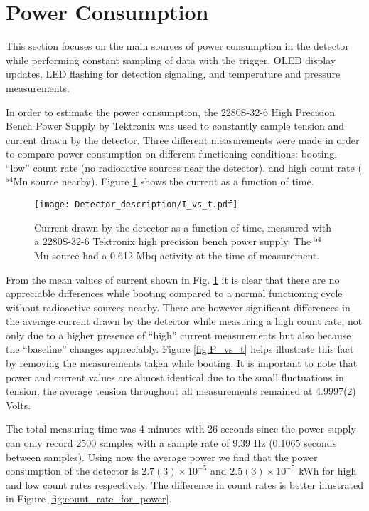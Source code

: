 \section{Power Consumption}

This section focuses on the main sources of power consumption in the detector while performing constant sampling of data with the trigger, OLED display updates, LED flashing for detection signaling, and temperature and pressure measurements.

In order to estimate the power consumption, the 2280S-32-6 High Precision Bench Power Supply by Tektronix was used to constantly sample tension and current drawn by the detector. Three different measurements were made in order to compare power consumption on different functioning conditions: booting, ``low'' count rate (no radioactive sources near the detector), and high count rate ($^{54}$Mn source nearby). Figure \ref{fig:I_vs_t} shows the current as a function of time.

\begin{figure}[H]
  \centering
  \texttt{[image: Detector\_description/I\_vs\_t.pdf]}
  \caption{Current drawn by the detector as a function of time, measured with a 2280S-32-6 Tektronix high precision bench power supply. The $^{54}$Mn source had a 0.612 Mbq activity at the time of measurement.}
  \label{fig:I_vs_t}
\end{figure}

From the mean values of current shown in Fig. \ref{fig:I_vs_t} it is clear that there are no appreciable differences while booting compared to a normal functioning cycle without radioactive sources nearby. There are however significant differences in the average current drawn by the detector while measuring a high count rate, not only due to a higher presence of ``high'' current measurements but also because the ``baseline'' changes appreciably. Figure \ref{fig:P_vs_t} helps illustrate this fact by removing the measurements taken while booting. It is important to note that power and current values are almost identical due to the small fluctuations in tension, the average tension throughout all measurements remained at 4.9997(2) Volts.

The total measuring time was 4 minutes with 26 seconds since the power supply can only record 2500 samples with a sample rate of 9.39 Hz (0.1065 seconds between samples). Using now the average power we find that the power consumption of the detector is $2.7(3)\times10^{-5}$ and $2.5(3)\times10^{-5}$ kWh for high and low count rates respectively. The difference in count rates is better illustrated in Figure \ref{fig:count_rate_for_power}.

